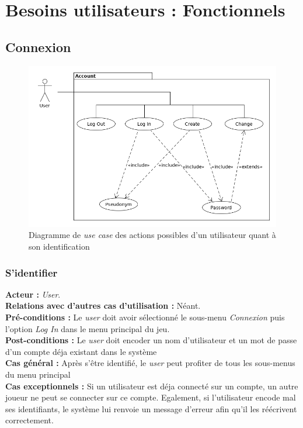 \documentclass[10pt, a4paper]{article}
\begin{document}

\section{Besoins utilisateurs : Fonctionnels}
		
		
\subsection{Connexion}

\begin{figure}[ht]
\includegraphics[scale=0.5]{UC_connexion.png}
\caption{Diagramme de \textit{use case} des actions possibles d'un utilisateur quant à son identification}
\label{UC_menu} %
\end{figure}

\subsubsection{S'identifier}
\textbf{Acteur :} \textit{User}.\\
\textbf{Relations avec d'autres cas d'utilisation :} Néant.\\
\textbf{Pré-conditions :} Le \textit{user} doit avoir sélectionné le sous-menu \textit{Connexion} puis l'option {\itshape Log In} dans le menu principal du jeu.\\
\textbf{Post-conditions :} Le \textit{user} doit encoder un nom d'utilisateur et un mot de passe d'un compte déja existant dans le système \\
\textbf{Cas général :} Après s'être identifié, le \textit{user} peut profiter de tous les sous-menus du menu principal\\
\textbf{Cas exceptionnels :} Si un utilisateur est déja connecté sur un compte, un autre joueur ne peut se connecter sur ce compte. Egalement, si l'utilisateur encode mal ses identifiants, le système lui renvoie un message d'erreur afin qu'il les réécrivent correctement.
\end{document}
